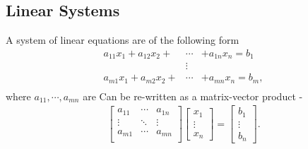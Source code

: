 \documentclass[../main.tex]{subfiles}
\begin{document}
\subsection{Linear Systems}

\noindent

\keyword{\textcolor{blue}{Linear Systems}} 

A system of linear equations are of the following form
\begin{eqnarray*}
    a_{11}x_{1} + a_{12}x_{2} + &\cdots& + a_{1n}x_{n} = b_{1} \\
    &\vdots& \\
    a_{m1}x_{1} + a_{m2}x_{2} + &\cdots& + a_{mn}x_{n} = b_{m}, \\
\end{eqnarray*}
where $a_{11}, \cdots, a_{mn}$ are 
\hspace{13pt}Can be re-written as a matrix-vector product -
\begin{align*}
    \begin{bmatrix}
        a_{11} & \cdots & a_{1n} \\
        \vdots & \ddots & \vdots \\
        a_{m1} & \cdots & a_{mn} \\
    \end{bmatrix}
    \begin{bmatrix}
        x_{1} \\
        \vdots \\
        x_{n}
    \end{bmatrix} =
    \begin{bmatrix}
        b_{1} \\
        \vdots \\
        b_{n}
    \end{bmatrix}.
\end{align*}
\end{document}
